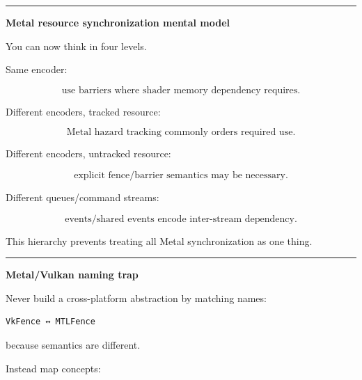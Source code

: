 \begin{center}\rule{0.5\linewidth}{0.5pt}\end{center}

\textbf{Metal resource synchronization mental model}

You can now think in four levels.

Same encoder:

\[
\text{use barriers where shader memory dependency requires}.
\]

Different encoders, tracked resource:

\[
\text{Metal hazard tracking commonly orders required use}.
\]

Different encoders, untracked resource:

\[
\text{explicit fence/barrier semantics may be necessary}.
\]

Different queues/command streams:

\[
\text{events/shared events encode inter-stream dependency}.
\]

This hierarchy prevents treating all Metal synchronization as one thing.

\begin{center}\rule{0.5\linewidth}{0.5pt}\end{center}

\textbf{Metal/Vulkan naming trap}

Never build a cross-platform abstraction by matching names:

\begin{verbatim}
VkFence ↔ MTLFence
\end{verbatim}

because semantics are different.

Instead map concepts:

